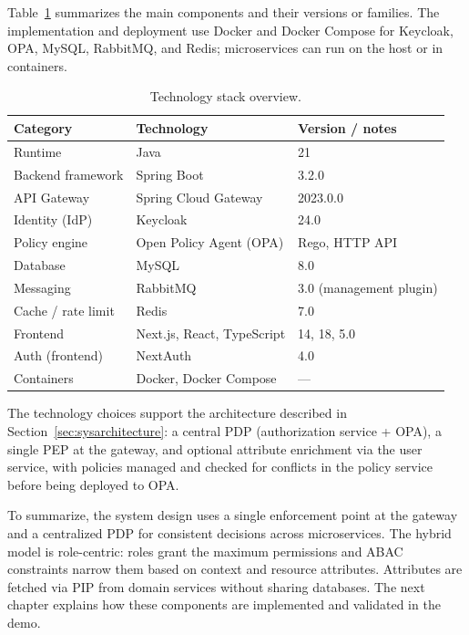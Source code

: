 Table~\ref{tab:tech-stack} summarizes the main components and their versions or families. The implementation and deployment use Docker and Docker Compose for Keycloak, OPA, MySQL, RabbitMQ, and Redis; microservices can run on the host or in containers.

\begin{table}[H]
\centering
\label{tab:tech-stack}
\begin{tabular}{|l|l|l|}
\hline
\textbf{Category} & \textbf{Technology} & \textbf{Version / notes} \\
\hline
Runtime & Java & 21 \\
Backend framework & Spring Boot & 3.2.0 \\
API Gateway & Spring Cloud Gateway & 2023.0.0 \\
Identity (IdP) & Keycloak & 24.0 \\
Policy engine & Open Policy Agent (OPA) & Rego, HTTP API \\
Database & MySQL & 8.0 \\
Messaging & RabbitMQ & 3.0 (management plugin) \\
Cache / rate limit & Redis & 7.0 \\
Frontend & Next.js, React, TypeScript & 14, 18, 5.0 \\
Auth (frontend) & NextAuth & 4.0 \\
Containers & Docker, Docker Compose & — \\
\hline
\end{tabular}
\caption{Technology stack overview.}
\label{tab:tech-stack}
\end{table}

The technology choices support the architecture described in Section~\ref{sec:sysarchitecture}: a central PDP (authorization service + OPA), a single PEP at the gateway, and optional attribute enrichment via the user service, with policies managed and checked for conflicts in the policy service before being deployed to OPA.
\vspace{0.5cm}

To summarize, the system design uses a single enforcement point at the gateway and a centralized PDP for consistent decisions across microservices. The hybrid model is role-centric: roles grant the maximum permissions and ABAC constraints narrow them based on context and resource attributes. Attributes are fetched via PIP from domain services without sharing databases. The next chapter explains how these components are implemented and validated in the demo.